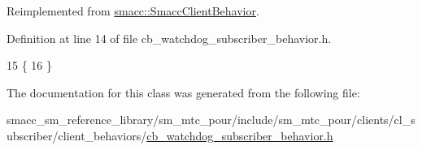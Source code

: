 Reimplemented from \hyperlink{classsmacc_1_1SmaccClientBehavior_a7962382f93987c720ad432fef55b123f}{smacc\+::\+Smacc\+Client\+Behavior}.



Definition at line 14 of file cb\+\_\+watchdog\+\_\+subscriber\+\_\+behavior.\+h.


\begin{DoxyCode}
15     \{
16     \}
\end{DoxyCode}


The documentation for this class was generated from the following file\+:\begin{DoxyCompactItemize}
\item 
smacc\+\_\+sm\+\_\+reference\+\_\+library/sm\+\_\+mtc\+\_\+pour/include/sm\+\_\+mtc\+\_\+pour/clients/cl\+\_\+subscriber/client\+\_\+behaviors/\hyperlink{sm__mtc__pour_2include_2sm__mtc__pour_2clients_2cl__subscriber_2client__behaviors_2cb__watchdog__subscriber__behavior_8h}{cb\+\_\+watchdog\+\_\+subscriber\+\_\+behavior.\+h}\end{DoxyCompactItemize}
